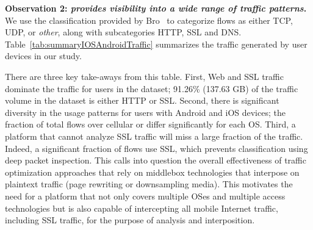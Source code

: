 \noindent\textbf{Observation 2: \emph{\meddle provides visibility into a wide range of traffic patterns}.} 
We use the classification provided by Bro~\cite{bro} to categorize flows as either TCP, UDP, or \emph{other}, along with subcategories HTTP, SSL and DNS.
Table~\ref{tab:summaryIOSAndroidTraffic} summarizes the traffic generated by user devices in our study. 

There are three key take-aways from this table. 
First, Web and SSL traffic dominate the traffic for users in the \mobWild dataset; 91.26\% (137.63 GB) of the traffic volume in the \mobWild dataset is either HTTP or SSL.
Second, there is significant diversity in the usage patterns for users with Android and iOS devices; the fraction of total flows over cellular or \wifi differ significantly for each OS. 
Third, a platform that cannot analyze SSL traffic will miss a large fraction of the traffic.
Indeed, a significant fraction of flows use SSL, which prevents classification using deep packet inspection.
This calls into question the overall effectiveness of traffic optimization approaches that rely on middlebox technologies that interpose on plaintext traffic (\eg page rewriting or downsampling media).
This motivates the need for a platform that not only covers multiple OSes and multiple access technologies but is also capable of intercepting all mobile Internet traffic, including SSL traffic, for the purpose of analysis and interposition. 

